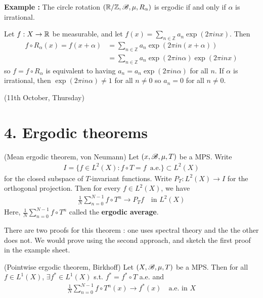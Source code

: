 \documentclass[10pt,a4paper]{report}
\newenvironment{proof}
{\begin{changemargin}{1cm}{0.5cm} 
	}%
	{\end{changemargin}
}
\begin{document}
\textbf{Example :} The circle rotation $(\mathbb{R}/\mathbb{Z},\mathscr{B}, \mu, R_{\alpha})$ is ergodic if and only if $\alpha$ is irrational.

\begin{proof}
\pf Let $f:X\rightarrow \mathbb{R}$ be measurable, and let $f(x) = \sum_{n\in \mathbb{Z}} a_n \exp(2\pi i nx)$. Then
\begin{align*}
f\circ R_{\alpha}(x) = f(x+\alpha) &= \sum_{n\in \mathbb{Z}}a_n \exp(2\pi in (x+\alpha)) \\
&= \sum_{n\in \mathbb{Z}} a_n \exp(2\pi in\alpha) \exp(2\pi i nx)
\end{align*}
so $f=f\circ R_{\alpha}$ is equivalent to having $a_n = a_n \exp(2\pi i n \alpha)$ for all $n$.
If $\alpha$ is irrational, then $\exp(2\pi in\alpha) \neq 1$ for all $n\neq 0$ so $a_n=0$ for all $n\neq 0$.

\eop
\end{proof}
\s

\newday

(11th October, Thursday)
\s

\section*{4. Ergodic theorems}

\thm (Mean ergodic theorem, von Neumann) Let $(x,\mathscr{B}, \mu, T)$ be a MPS. Write
\begin{align*}
I = \{ f\in L^2(X) : f\circ T = f \,\,\, \text{a.e.} \}  \subset L^2(X)
\end{align*}
for the closed subspace of $T$-invariant functions. Write $P_T : L^2(X) \rightarrow I$ for the orthogonal projection. Then for every $f\in L^2(X)$, we have
\begin{align*}
\frac{1}{N} \sum_{n=0}^{N-1} f\circ T^n \rightarrow P_T f \quad \text{in } L^2(X)
\end{align*}
Here, $\frac{1}{N} \sum_{n=0}^{N-1} f\circ T^n$ called the \textbf{ergodic average}.
\s

There are two proofs for this theorem : one uses spectral theory and the the other does not. We would prove using the second approach, and sketch the first proof in the example sheet.

\s

\thm (Pointwise ergodic theorem, Birkhoff) Let $(X,\mathscr{B}, \mu, T)$ be a MPS. Then for all $f\in L^1(X)$, $\exists f^* \in L^1(X)$ s.t. $f^* = f^* \circ T$ a.e. and 
\begin{align*}
\frac{1}{N} \sum_{n=0}^{N-1} f\circ T^n (x) \rightarrow f^*(x) \quad \text{a.e. in } X 
\end{align*}
\s
\end{document}
